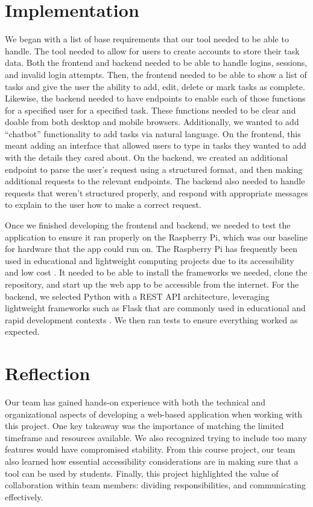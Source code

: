 \documentclass[11pt]{report}
\begin{document}
\chapter{Implementation}
We began with a list of base requirements that our tool needed to be able to handle. The tool needed to allow for users to create accounts to store their task data. Both the frontend and backend needed to be able to handle logins, sessions, and invalid login attempts. Then, the frontend needed to be able to show a list of tasks and give the user the ability to add, edit, delete or mark tasks as complete. Likewise, the backend needed to have endpoints to enable each of those functions for a specified user for a specified task. These functions needed to be clear and doable from both desktop and mobile browsers. Additionally, we wanted to add “chatbot” functionality to add tasks via natural language. On the frontend, this meant adding an interface that allowed users to type in tasks they wanted to add with the details they cared about. On the backend, we created an additional endpoint to parse the user’s request using a structured format, and then making additional requests to the relevant endpoints. The backend also needed to handle requests that weren’t structured properly, and respond with appropriate messages to explain to the user how to make a correct request. 

Once we finished developing the frontend and backend, we needed to test the application to ensure it ran properly on the Raspberry Pi, which was our baseline for hardware that the app could run on. The Raspberry Pi has frequently been used in educational and lightweight computing projects due to its accessibility and low cost \citep{richardson2014getting}. It needed to be able to install the frameworks we needed, clone the repository, and start up the web app to be accessible from the internet. For the backend, we selected Python with a REST API architecture, leveraging lightweight frameworks such as Flask that are commonly used in educational and rapid development contexts \citep{grinberg2018flask}. We then ran tests to ensure everything worked as expected.


\chapter{Reflection}
Our team has gained hands-on experience with both the technical and organizational aspects of developing a web-based application when working with this project. One key takeaway was the importance of matching the limited timeframe and resources available. We also recognized trying to include too many features would have compromised stability. From this course project, our team also learned how essential accessibility considerations are in making sure that a tool can be used by students. Finally, this project highlighted the value of collaboration within team members: dividing responsibilities, and communicating effectively. 
\end{document}
